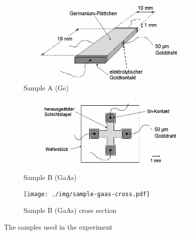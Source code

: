 \begin{figure}
	\centering
	\begin{subfigure}{0.45\textwidth}
		\centering
		\includegraphics[width=\textwidth]{./img/sample-ge.png}
		\caption{Sample A (Ge)}
		\label{fig:samples:ge}
	\end{subfigure}
	\begin{subfigure}{0.45\textwidth}
		\centering
		\includegraphics[width=\textwidth]{./img/sample-gaas-clover.png}
		\caption{Sample B (GaAs)}
		\label{fig:samples:gaas-clover}
	\end{subfigure}
  \par\bigskip
	\begin{subfigure}{0.7\textwidth}
		\centering
		\texttt{[image: ./img/sample-gaas-cross.pdf]}
		\caption{Sample B (GaAs) cross section}
		\label{fig:samples:gaas-cross}
	\end{subfigure}
	\caption{The samples used in the experiment}
\end{figure}
